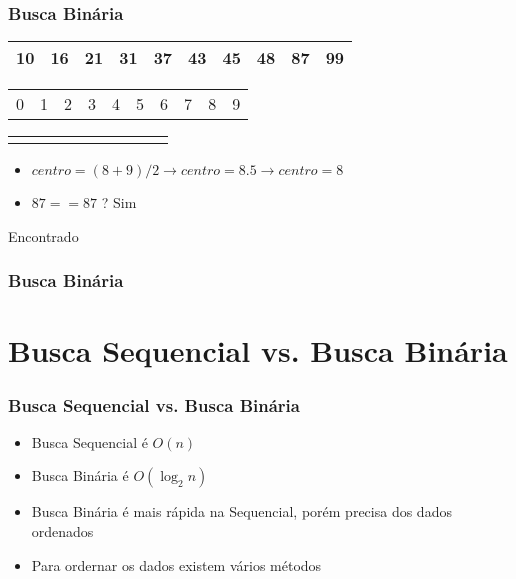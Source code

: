 \documentclass{beamer}
\begin{document}
\begin{frame}
    \frametitle{Busca Binária}
    \begin{center}
        \begin{table}
            \begin{tabular}{| p{0.25cm} | p{0.25cm} | p{0.25cm} | p{0.25cm} | p{0.25cm} | p{0.25cm} | p{0.25cm} | p{0.25cm} | p{0.25cm} | p{0.25cm} |}
                \hline
                10 & 16 & 21 & 31 & 37 & 43 & 45 & 48 & 87 & 99 \\ \hline
            \end{tabular}
            \begin{tabular}{p{0.25cm} p{0.25cm} p{0.25cm} p{0.25cm} p{0.25cm} p{0.25cm} p{0.25cm} p{0.25cm} p{0.25cm} p{0.25cm}}
                0 & 1 & 2 & 3 & 4 & 5 & 6 & 7 & 8 & 9
            \end{tabular}
            \begin{tabular}{p{0.25cm} p{0.25cm} p{0.25cm} p{0.25cm} p{0.25cm} p{0.25cm} p{0.25cm} p{0.25cm} p{0.25cm} p{0.25cm}}
                & & & & \color{blue}{$\uparrow$} & & & \color{blue}{$\uparrow$} & \color{red}{$\uparrow$} &
            \end{tabular}
        \end{table}
	\end{center}
    \begin{itemize}
        \item $centro = (8 + 9) / 2 \rightarrow centro = 8.5 \rightarrow centro = 8$
        \item $87 == 87$ ? Sim
    \end{itemize}
    \begin{center}
        \Large Encontrado
    \end{center}
\end{frame}

\begin{frame}
	\frametitle{Busca Binária}
    \centering
    
\end{frame}

\section{Busca Sequencial vs. Busca Binária}

\begin{frame}
	\frametitle{Busca Sequencial vs. Busca Binária}
    \begin{itemize}
        \item Busca Sequencial é $O(n)$
        \item Busca Binária é $O(\log_2 n)$
        \item Busca Binária é mais rápida na Sequencial, porém precisa dos dados ordenados
        \item Para ordernar os dados existem vários métodos
    \end{itemize}
\end{frame}
\end{document}

